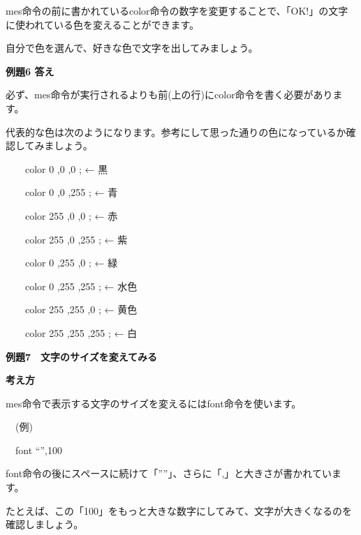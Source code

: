 \documentclass[a4paper,dvipdfmx]{jarticle}
\newcommand\textstyleqwerty[1]{#1}
\begin{document}
\bigskip


\bigskip


\bigskip

mes命令の前に書かれているcolor命令の数字を変更することで、「OK!」の文字に使われている色を変えることができます。

自分で色を選んで、好きな色で文字を出してみましょう。


\bigskip


\bigskip

{\bfseries
例題6 答え}


\bigskip

必ず、mes命令が実行されるよりも前(上の行)にcolor命令を書く必要があります。

代表的な色は次のようになります。参考にして思った通りの色になっているか確認してみましょう。


\bigskip

\ \ \ \ color 0 ,0 ,0 ; ← 黒 

\ \ \ \ color 0 ,0 ,255 ; ← 青 

\ \ \ \ color 255 ,0 ,0 ; ← 赤 

\ \ \ \ color 255 ,0 ,255 ; ← 紫 

\ \ \ \ color 0 ,255 ,0 ; ← 緑 

\ \ \ \ color 0 ,255 ,255 ; ← 水色 

\ \ \ \ color 255 ,255 ,0 ; ← 黄色 

\ \ \ \ color 255 ,255 ,255 ; ← 白 


\bigskip


\bigskip


\bigskip


\bigskip

\textstyleqwerty{\textbf{例題7　文字のサイズを変えてみる}}


\bigskip

{\bfseries
考え方}


\bigskip

mes命令で表示する文字のサイズを変えるにはfont命令を使います。


\bigskip

\ \ (例)

\ \ font “”,100


\bigskip

font命令の後にスペースに続けて「””」、さらに「,」と大きさが書かれています。

たとえば、この「100」をもっと大きな数字にしてみて、文字が大きくなるのを確認しましょう。


\bigskip


\bigskip
\end{document}
